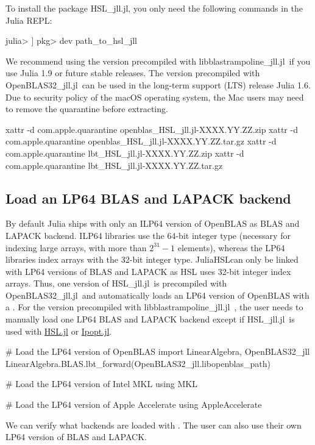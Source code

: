 \documentclass[gdweb]{geradwp}
\newcommand{\JuliaHSL}{JuliaHSL}  %
\newcommand{\HSLjll}{HSL\_jll.jl}
\newcommand{\LBTjll}{libblastrampoline\_jll.jl}
\newcommand{\OpenBLASjll}{OpenBLAS32\_jll.jl}
\begin{document}
To install the package \HSLjll, you only need the following commands in the Julia REPL:
\begin{jllisting}
julia> ]
pkg> dev path_to_hsl_jll
\end{jllisting}
We recommend using the version precompiled with \LBTjll~if you use Julia 1.9 or future stable releases.
The version precompiled with \OpenBLASjll~can be used in the long-term support (LTS) release Julia 1.6.
Due to security policy of the macOS operating system, the Mac users may need to remove the quarantine before extracting.
\begin{jllisting}
xattr -d com.apple.quarantine openblas_HSL_jll.jl-XXXX.YY.ZZ.zip
xattr -d com.apple.quarantine openblas_HSL_jll.jl-XXXX.YY.ZZ.tar.gz
xattr -d com.apple.quarantine lbt_HSL_jll.jl-XXXX.YY.ZZ.zip
xattr -d com.apple.quarantine lbt_HSL_jll.jl-XXXX.YY.ZZ.tar.gz
\end{jllisting}

\subsection{Load an LP64 BLAS and LAPACK backend}

By default Julia ships with only an ILP64 version of OpenBLAS as BLAS and LAPACK backend.
ILP64 libraries use the 64-bit integer type (necessary for indexing large arrays, with more than $2^{31}-1$ elements), whereas the LP64 libraries index arrays with the 32-bit integer type.
\JuliaHSL can only be linked with LP64 versions of BLAS and LAPACK as HSL uses 32-bit integer index arrays.
Thus, one version of \HSLjll~is precompiled with \OpenBLASjll~and automatically loads an LP64 version of OpenBLAS with a .
For the version precompiled with \LBTjll~, the user needs to manually load one LP64 BLAS and LAPACK backend except if \HSLjll~is used with \href{https://github.com/JuliaSmoothOptimizers/HSL.jl}{HSL.jl} or \href{https://github.com/jump-dev/Ipopt.jl}{Ipopt.jl}.
\begin{jllisting}
# Load the LP64 version of OpenBLAS
import LinearAlgebra, OpenBLAS32_jll
LinearAlgebra.BLAS.lbt_forward(OpenBLAS32_jll.libopenblas_path)

# Load the LP64 version of Intel MKL
using MKL

# Load the LP64 version of Apple Accelerate
using AppleAccelerate
\end{jllisting}
We can verify what backends are loaded with .
The user can also use their own LP64 version of BLAS and LAPACK.
\end{document}
